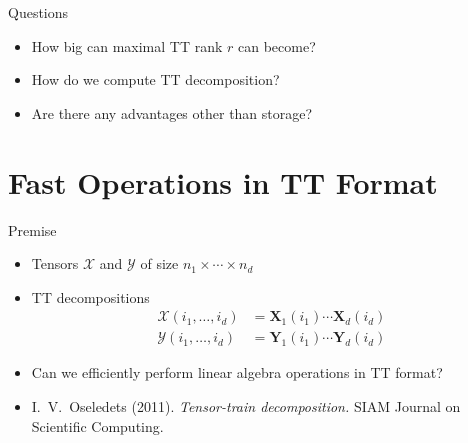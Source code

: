 \documentclass[aspectratio=169]{beamer}
\newcommand{\Mat}[1]{\mathbf{#1}}
\newcommand{\Tns}[1]{\mathcal{#1}}
\begin{document}
\begin{frame}{Questions}
  \begin{itemize}
    \item
      How big can maximal TT rank $r$ can become?
    \item
      How do we compute TT decomposition?
    \item
      Are there any advantages other than storage?
  \end{itemize}
\end{frame}

\section{Fast Operations in TT Format}

\begin{frame}{Premise}
  \begin{itemize}
    \item
      Tensors $\Tns{X}$ and $\Tns{Y}$ of size $n_1 \times \cdots \times n_d$
    \item
      TT decompositions
      \begin{align*}
        \Tns{X}(i_1, \ldots, i_d) &= \Mat{X}_1(i_1) \cdots \Mat{X}_d(i_d) \\
        \Tns{Y}(i_1, \ldots, i_d) &= \Mat{Y}_1(i_1) \cdots \Mat{Y}_d(i_d)
      \end{align*}
    \item
      Can we efficiently perform linear algebra operations in TT format?
    \item
      I.\ V.\ Oseledets (2011). \textit{Tensor-train decomposition.} SIAM
      Journal on Scientific Computing.
  \end{itemize}
\end{frame}
\end{document}
